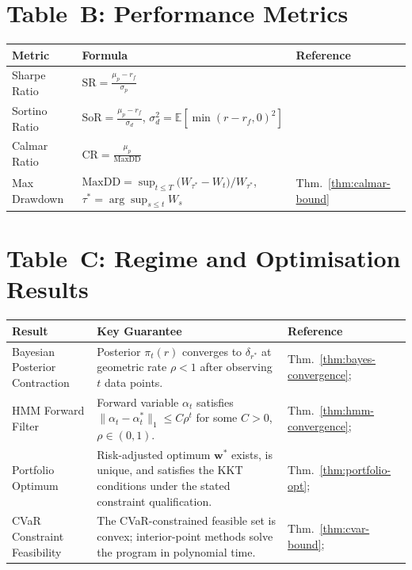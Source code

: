 \documentclass[12pt,openany]{book}
\newcommand{\MaxDD}{\mathrm{MaxDD}}
\newcommand{\E}{\mathbb{E}}
\numberwithin{equation}{chapter}
\theoremstyle{plain}
\theoremstyle{definition}
\theoremstyle{remark}
\numberwithin{equation}{chapter}
\theoremstyle{plain}
\begin{document}
\section*{Table~B: Performance Metrics}

\begin{center}
\begin{tabularx}{\textwidth}{@{} l X l @{}}
\hline
\textbf{Metric} & \textbf{Formula} & \textbf{Reference} \\
\hline
Sharpe Ratio &
  $\mathrm{SR} = \displaystyle\frac{\mu_p - r_f}{\sigma_p}$ &
  \cite{R3} \\
\addlinespace
Sortino Ratio &
  $\mathrm{SoR} = \displaystyle\frac{\mu_p - r_f}{\sigma_d}$,\quad
  $\sigma_d^2 = \E[\min(r-r_f,0)^2]$ &
  \cite{R4} \\
\addlinespace
Calmar Ratio &
  $\mathrm{CR} = \displaystyle\frac{\mu_p}{\MaxDD}$ &
  \cite{R10} \\
\addlinespace
Max Drawdown &
  $\MaxDD = \sup_{t\le T}\bigl(W_{\tau^*} - W_t\bigr)/W_{\tau^*}$,\quad
  $\tau^* = \arg\sup_{s\le t}W_s$ &
  Thm.~\ref{thm:calmar-bound} \\
\hline
\end{tabularx}
\end{center}

\section*{Table~C: Regime and Optimisation Results}

\begin{center}
\begin{tabularx}{\textwidth}{@{} l X l @{}}
\hline
\textbf{Result} & \textbf{Key Guarantee} & \textbf{Reference} \\
\hline
Bayesian Posterior Contraction &
  Posterior $\pi_t(r)$ converges to $\delta_{r^*}$ at geometric rate
  $\rho < 1$ after observing $t$ data points. &
  Thm.~\ref{thm:bayes-convergence};~\cite{R6} \\
\addlinespace
HMM Forward Filter &
  Forward variable $\alpha_t$ satisfies
  $\|\alpha_t - \alpha_t^*\|_1 \le C\rho^t$ for some
  $C>0$, $\rho\in(0,1)$. &
  Thm.~\ref{thm:hmm-convergence};~\cite{R13} \\
\addlinespace
Portfolio Optimum &
  Risk-adjusted optimum $\mathbf{w}^*$ exists, is unique, and satisfies
  the KKT conditions under the stated constraint qualification. &
  Thm.~\ref{thm:portfolio-opt};~\cite{R1} \\
\addlinespace
CVaR Constraint Feasibility &
  The CVaR-constrained feasible set is convex; interior-point methods
  solve the program in polynomial time. &
  Thm.~\ref{thm:cvar-bound};~\cite{R5,R8} \\
\hline
\end{tabularx}
\end{center}
\end{document}
